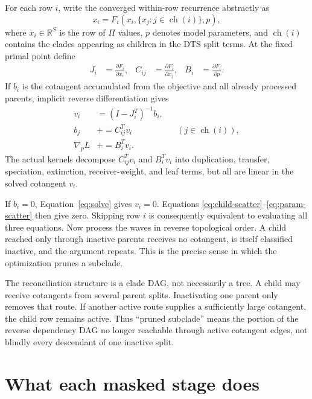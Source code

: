 \documentclass[11pt]{article}
\newcommand{\R}{\mathbb{R}}
\begin{document}
For each row $i$, write the converged within-row recurrence abstractly as
\begin{equation}
  x_i=F_i(x_i,\{x_j:j\in\operatorname{ch}(i)\},p),
  \label{eq:row-map}
\end{equation}
where $x_i\in\R^S$ is the row of $\Pi$ values, $p$ denotes model parameters,
and $\operatorname{ch}(i)$ contains the clades appearing as children in the
DTS split terms.  At the fixed primal point define
\begin{align}
  J_i &= \frac{\partial F_i}{\partial x_i}, &
  C_{ij} &= \frac{\partial F_i}{\partial x_j}, &
  B_i &= \frac{\partial F_i}{\partial p}.
\end{align}
If $b_i$ is the cotangent accumulated from the objective and all already
processed parents, implicit reverse differentiation gives
\begin{align}
  v_i &= (I-J_i^T)^{-1}b_i, \label{eq:solve}\\
  b_j &\mathrel{+}= C_{ij}^T v_i
    && (j\in\operatorname{ch}(i)), \label{eq:child-scatter}\\
  \nabla_p L &\mathrel{+}= B_i^T v_i. \label{eq:param-scatter}
\end{align}
The actual kernels decompose $C_{ij}^Tv_i$ and $B_i^Tv_i$ into duplication,
transfer, speciation, extinction, receiver-weight, and leaf terms, but all are
linear in the solved cotangent $v_i$.

If $b_i=0$, Equation~\eqref{eq:solve} gives $v_i=0$.  Equations
\eqref{eq:child-scatter}--\eqref{eq:param-scatter} then give zero.  Skipping
row $i$ is consequently equivalent to evaluating all three equations.  Now
process the waves in reverse topological order.  A child reached only through
inactive parents receives no cotangent, is itself classified inactive, and
the argument repeats.  This is the precise sense in which the optimization
prunes a subclade.

The reconciliation structure is a clade DAG, not necessarily a tree.  A child
may receive cotangents from several parent splits.  Inactivating one parent
only removes that route.  If another active route supplies a sufficiently
large cotangent, the child row remains active.  Thus ``pruned subclade'' means
the portion of the reverse dependency DAG no longer reachable through active
cotangent edges, not blindly every descendant of one inactive split.

\section{What each masked stage does}
\end{document}
